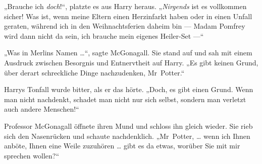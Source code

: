 „Brauche ich \emph{doch}!“, platzte es aus Harry heraus.
„\emph{Nirgends} ist es vollkommen sicher! Was ist, wenn meine Eltern einen Herzinfarkt haben oder in einen Unfall geraten, während ich in den Weihnachtsferien daheim bin — Madam Pomfrey wird dann nicht da sein, ich brauche mein eigenes Heiler-Set —“

„Was in Merlins Namen …“, sagte McGonagall. Sie stand auf und sah mit einem Ausdruck zwischen Besorgnis und Entnervtheit auf Harry.
„Es gibt keinen Grund, über derart schreckliche Dinge nachzudenken, Mr~Potter.“

Harrys Tonfall wurde bitter, als er das hörte.
„Doch, es gibt einen Grund. Wenn man nicht nachdenkt, schadet man nicht nur sich selbst, sondern man verletzt auch andere Menschen!“

Professor McGonagall öffnete ihren Mund und schloss ihn gleich wieder. Sie rieb sich den Nasenrücken und schaute nachdenklich.
„Mr~Potter, … wenn ich Ihnen anböte, Ihnen eine Weile zuzuhören … gibt es da etwas, worüber Sie mit mir sprechen wollen?“

